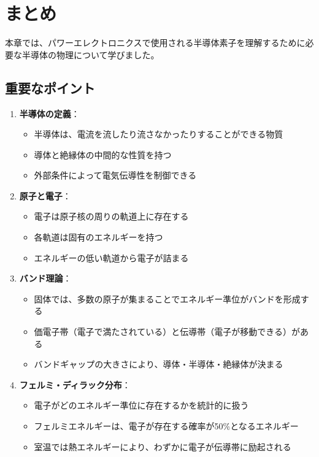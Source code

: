 \section{まとめ}

本章では、パワーエレクトロニクスで使用される半導体素子を理解するために必要な半導体の物理について学びました。

\subsection{重要なポイント}

\begin{enumerate}
\item \textbf{半導体の定義}：
\begin{itemize}
\item 半導体は、電流を流したり流さなかったりすることができる物質
\item 導体と絶縁体の中間的な性質を持つ
\item 外部条件によって電気伝導性を制御できる
\end{itemize}

\item \textbf{原子と電子}：
\begin{itemize}
\item 電子は原子核の周りの軌道上に存在する
\item 各軌道は固有のエネルギーを持つ
\item エネルギーの低い軌道から電子が詰まる
\end{itemize}

\item \textbf{バンド理論}：
\begin{itemize}
\item 固体では、多数の原子が集まることでエネルギー準位がバンドを形成する
\item 価電子帯（電子で満たされている）と伝導帯（電子が移動できる）がある
\item バンドギャップの大きさにより、導体・半導体・絶縁体が決まる
\end{itemize}

\item \textbf{フェルミ・ディラック分布}：
\begin{itemize}
\item 電子がどのエネルギー準位に存在するかを統計的に扱う
\item フェルミエネルギーは、電子が存在する確率が50\%となるエネルギー
\item 室温では熱エネルギーにより、わずかに電子が伝導帯に励起される
\end{itemize}


\end{enumerate}
